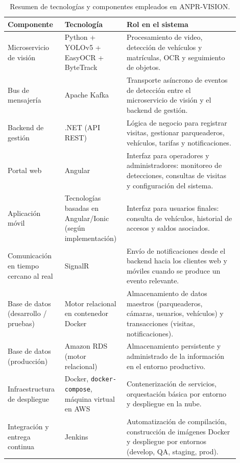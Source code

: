 \begin{table}[ht]
    \centering
    \caption{Resumen de tecnologías y componentes empleados en ANPR-VISION.}
    \label{tab:tecnologias_componentes}
    \begin{tabular}{p{0.22\linewidth} p{0.22\linewidth} p{0.46\linewidth}}
        \hline
        \textbf{Componente} & \textbf{Tecnología} & \textbf{Rol en el sistema} \\
        \hline
        Microservicio de visión &
        Python + YOLOv5 + EasyOCR + ByteTrack &
        Procesamiento de video, detección de vehículos y matrículas, OCR y seguimiento de objetos. \\[0.4em]

        Bus de mensajería &
        Apache Kafka &
        Transporte asíncrono de eventos de detección entre el microservicio de visión y el backend de gestión. \\[0.4em]

        Backend de gestión &
        .NET (API REST) &
        Lógica de negocio para registrar visitas, gestionar parqueaderos, vehículos, tarifas y notificaciones. \\[0.4em]

        Portal web &
        Angular &
        Interfaz para operadores y administradores: monitoreo de detecciones, consultas de visitas y configuración del sistema. \\[0.4em]

        Aplicación móvil &
        Tecnologías basadas en Angular/Ionic (según implementación) &
        Interfaz para usuarios finales: consulta de vehículos, historial de accesos y saldos asociados. \\[0.4em]

        Comunicación en tiempo cercano al real &
        SignalR &
        Envío de notificaciones desde el backend hacia los clientes web y móviles cuando se produce un evento relevante. \\[0.4em]

        Base de datos (desarrollo / pruebas) &
        Motor relacional en contenedor Docker &
        Almacenamiento de datos maestros (parqueaderos, cámaras, usuarios, vehículos) y transacciones (visitas, notificaciones). \\[0.4em]

        Base de datos (producción) &
        Amazon RDS (motor relacional) &
        Almacenamiento persistente y administrado de la información en el entorno productivo. \\[0.4em]

        Infraestructura de despliegue &
        Docker, \texttt{docker-compose}, máquina virtual en AWS &
        Contenerización de servicios, orquestación básica por entorno y despliegue en la nube. \\[0.4em]

        Integración y entrega continua &
        Jenkins &
        Automatización de compilación, construcción de imágenes Docker y despliegue por entornos (develop, QA, staging, prod). \\
        \hline
    \end{tabular}
\end{table}


